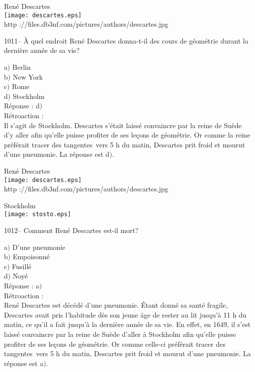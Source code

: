﻿\documentclass[letterpaper, 12pt]{article}
\begin{document}
        \begin{center}
        Ren\'e Descartes\\
    \texttt{[image: descartes.eps]}\\
        {\footnotesize http
://files.db3nf.com/pictures/authors/descartes.jpg}
    \end{center}

1011-- \`A quel endroit Ren\'e Descartes donna-t-il des cours de
g\'eom\'etrie durant la derni\`ere ann\'ee de sa vie?

a$)$ Berlin \\
b$)$ New York \\
c$)$ Rome \\
d$)$ Stockholm\\

R\'eponse : d$)$\\

R\'etroaction :\\
Il s'agit de Stockholm. Descartes s'\'etait laiss\'e convaincre par
la reine de Su\`ede d'y aller afin qu'elle puisse profiter de ses
le\c cons de g\'eom\'etrie.  Or comme la reine pr\'ef\'erait \og
tracer des tangentes\fg\ vers 5 h du matin, Descartes prit froid et
mourut d'une pneumonie.
La r\'eponse est d$)$.\\

        \begin{center}
        Ren\'e Descartes\\
    \texttt{[image: descartes.eps]}\\
        {\footnotesize http
://files.db3nf.com/pictures/authors/descartes.jpg}
    \end{center}

        \begin{center}
        Stockholm\\
    \texttt{[image: stosto.eps]}\\
    \end{center}

1012-- Comment Ren\'e Descartes est-il mort?

a$)$ D'une pneumonie \\
b$)$ Empoisonn\'e \\
c$)$ Fusill\'e \\
d$)$ Noy\'e\\

R\'eponse : a$)$\\

R\'etroaction :\\
Ren\'e Descartes est d\'ec\'ed\'e d'une pneumonie. \'Etant donn\'e
sa sant\'e fragile, Descartes avait pris l'habitude d\`es son jeune
\^age de rester au lit jusqu'\`a 11 h du matin, ce qu'il a fait
jusqu'\`a la derni\`ere ann\'ee de sa vie.  En effet, en 1649, il
s'est laiss\'e convaincre par la reine de Su\`ede d'aller \`a
Stockholm afin qu'elle puisse profiter de ses le\c cons de
g\'eom\'etrie.  Or comme celle-ci pr\'ef\'erait \og tracer des
tangentes\fg\ vers 5 h du matin, Descartes prit froid et mourut
d'une pneumonie.
La r\'eponse est a$)$.\\
\end{document}
